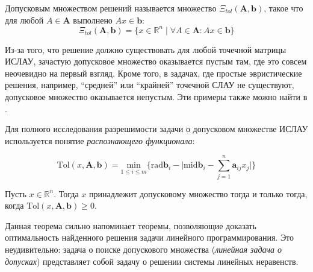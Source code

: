 \begin{definition}
	Допусковым множеством решений называется множество $\Xi_{tol}(\mathbf{A}, \mathbf{b})$, такое что для любой $A \in \mathbf{A}$ выполнено $Ax \in \mathbf{b}$:
	\begin{equation}
	\Xi_{tol}(\mathbf{A}, \mathbf{b}) = \{ x \in \mathbb{R}^n \; | \; \forall A \in \mathbf{A}: Ax \in \mathbf{b} \}
	\end{equation}
\end{definition}

Из-за того, что решение должно существовать для любой точечной матрицы ИСЛАУ, зачастую допусковое множество оказывается пустым там, где это совсем неочевидно на первый взгляд. Кроме того, в задачах, где простые эвристические решения, например, ``средней'' или ``крайней'' точечной СЛАУ не существуют, допусковое множество оказывается непустым. Эти примеры также можно найти в \cite{intv}.

Для полного исследования разрешимости задачи о допусковом множестве ИСЛАУ используется понятие \textit{распознающего функционала}:

\begin{equation}
\textrm{Tol}(x, \mathbf{A}, \mathbf{b}) = \underset{1 \leq i \leq m}{\textrm{min}} \bigg \lbrace \textrm{rad} \mathbf{b}_i - \bigg| \textrm{mid} \mathbf{b}_i - \sum_{j=1}^{n} \mathbf{a}_{ij}x_j \bigg|  \bigg \rbrace
\end{equation}

\begin{theorem}
	Пусть $x \in \mathbb{R}^n$. Тогда $x$ принадлежит допусковому множество тогда и только тогда, когда $\textrm{Tol}(x, \mathbf{A}, \mathbf{b}) \geq 0$.
\end{theorem}

Данная теорема сильно напоминает теоремы, позволяющие доказать оптимальность найденного решения задачи линейного программирования. Это неудивительно: задача о поиске допускового множества (\textit{линейная задача о допусках}) представляет собой задачу о решении системы линейных неравенств.